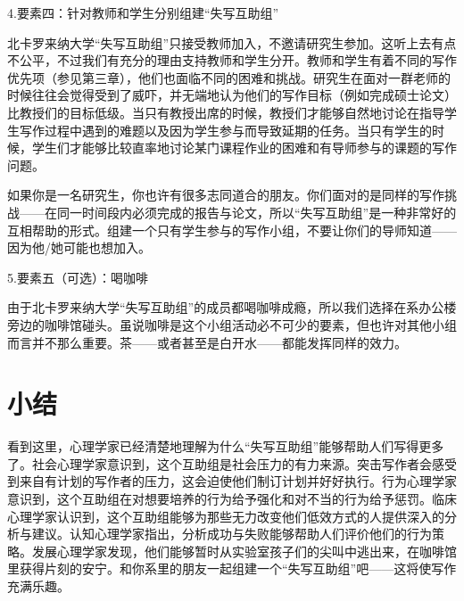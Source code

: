 {\kaishu 4.要素四：针对教师和学生分别组建“失写互助组”}

北卡罗来纳大学“失写互助组”只接受教师加入，不邀请研究生参加。这听上去有点不公平，不过我们有充分的理由支持教师和学生分开。教师和学生有着不同的写作优先项（参见第三章），他们也面临不同的困难和挑战。研究生在面对一群老师的时候往往会觉得受到了威吓，并无端地认为他们的写作目标（例如完成硕士论文）比教授们的目标低级。当只有教授出席的时候，教授们才能够自然地讨论在指导学生写作过程中遇到的难题以及因为学生参与而导致延期的任务。当只有学生的时候，学生们才能够比较直率地讨论某门课程作业的困难和有导师参与的课题的写作问题。

如果你是一名研究生，你也许有很多志同道合的朋友。你们面对的是同样的写作挑战——在同一时间段内必须完成的报告与论文，所以“失写互助组”是一种非常好的互相帮助的形式。组建一个只有学生参与的写作小组，不要让你们的导师知道——因为他/她可能也想加入。

{\kaishu 5.要素五（可选）：喝咖啡}

由于北卡罗来纳大学“失写互助组”的成员都喝咖啡成瘾，所以我们选择在系办公楼旁边的咖啡馆碰头。虽说咖啡是这个小组活动必不可少的要素，但也许对其他小组而言并不那么重要。茶——或者甚至是白开水——都能发挥同样的效力。

\section{小结}
看到这里，心理学家已经清楚地理解为什么“失写互助组”能够帮助人们写得更多了。社会心理学家意识到，这个互助组是社会压力的有力来源。突击写作者会感受到来自有计划的写作者的压力，这会迫使他们制订计划并好好执行。行为心理学家意识到，这个互助组在对想要培养的行为给予强化和对不当的行为给予惩罚。临床心理学家认识到，这个互助组能够为那些无力改变他们低效方式的人提供深入的分析与建议。认知心理学家指出，分析成功与失败能够帮助人们评价他们的行为策略。发展心理学家发现，他们能够暂时从实验室孩子们的尖叫中逃出来，在咖啡馆里获得片刻的安宁。和你系里的朋友一起组建一个“失写互助组”吧——这将使写作充满乐趣。







